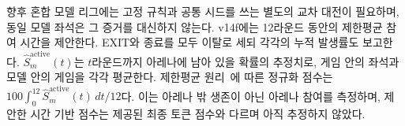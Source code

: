 향후 혼합 모델 리그에는 고정 규칙과 공통 시드를 쓰는 별도의 교차 대전이 필요하며, 동일 모델 좌석은 그 증거를 대신하지 않는다. v14f에는 12라운드 동안의 제한평균 참여 시간을 제안한다. EXIT와 종료를 모두 이탈로 세되 각각의 누적 발생률도 보고한다. $\widehat S^{\mathrm{active}}_m(t)$는 $t$라운드까지 아레나에 남아 있을 확률의 추정치로, 게임 안의 좌석과 모델 안의 게임을 각각 평균한다. 제한평균 원리~\citep{uno2014moving}에 따른 정규화 점수는 $100\int_0^{12}\widehat S^{\mathrm{active}}_m(t)\,dt/12$다. 이는 아레나 밖 생존이 아닌 아레나 참여를 측정하며, 제안한 시간 기반 점수는 제공된 최종 토큰 점수와 다르며 아직 추정하지 않았다.
